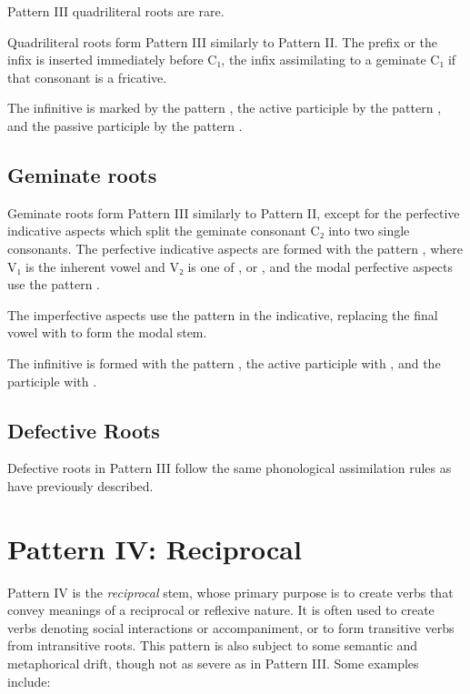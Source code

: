 \documentclass[grammar]{subfiles}
\begin{document}
Pattern III quadriliteral roots are rare. 

Quadriliteral roots form Pattern III similarly to Pattern II. The prefix
 or the infix  is inserted immediately before C₁, the infix
assimilating to a geminate C₁ if that consonant is a fricative. 

The infinitive is marked by the pattern , the active participle
by the pattern , and the passive participle by the pattern
.


\subsection{Geminate roots}
\label{ssec:vm_iii_geminate_roots}

Geminate roots form Pattern III similarly to Pattern II, except for the
perfective indicative aspects which split the geminate consonant C₂ into two
single consonants.   The perfective indicative aspects are formed with the
pattern , where V₁ is the inherent vowel and V₂ is one of
,  or , and the modal perfective aspects use the pattern
.  

The imperfective aspects use the pattern  in the indicative,
replacing the final vowel with  to form the modal stem. 

The infinitive is formed with the pattern , the active participle
with , and the participle with .  



\subsection{Defective Roots}
\label{ssec:vm_iii_defective_roots}

Defective roots in Pattern III follow the same phonological assimilation rules
as have previously described. 


\clearpage
\section{Pattern IV: Reciprocal}
\label{sec:vm_pattern_iv}

Pattern IV is the \emph{reciprocal} stem, whose primary purpose is to create
verbs that convey meanings of a reciprocal or reflexive nature.  It is often
used to create verbs denoting social interactions or accompaniment, or to form
transitive verbs from intransitive roots.  This pattern is also subject to some
semantic and metaphorical drift, though not as severe as in Pattern III. Some
examples include:
\end{document}
